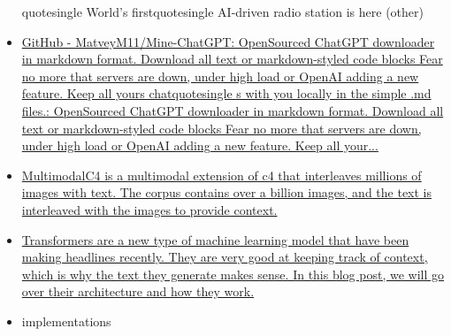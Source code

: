 \begin{itemize}
{  quotesingle World's firstquotesingle{} AI-driven radio
  station is here (other)}
\item
  \href{https://github.com/MatveyM11/Mine-ChatGPT}{GitHub -
  MatveyM11/Mine-ChatGPT: OpenSourced ChatGPT downloader in markdown
  format. Download all text or markdown-styled code blocks Fear no more
  that servers are down, under high load or OpenAI adding a new feature.
  Keep all yours chatquotesingle s with you locally in the simple
  .md files.: OpenSourced ChatGPT downloader in markdown format.
  Download all text or markdown-styled code blocks Fear no more that
  servers are down, under high load or OpenAI adding a new feature. Keep
  all your...}
\item
  \href{https://github.com/allenai/mmc4}{MultimodalC4 is a multimodal
  extension of c4 that interleaves millions of images with text. The
  corpus contains over a billion images, and the text is interleaved
  with the images to provide context.}
\item
  \href{https://txt.cohere.ai/what-are-transformer-models/}{Transformers
  are a new type of machine learning model that have been making
  headlines recently. They are very good at keeping track of context,
  which is why the text they generate makes sense. In this blog post, we
  will go over their architecture and how they work.}
\item
  implementations

  \begin{itemize}
   

\end{itemize}
\end{itemize}
